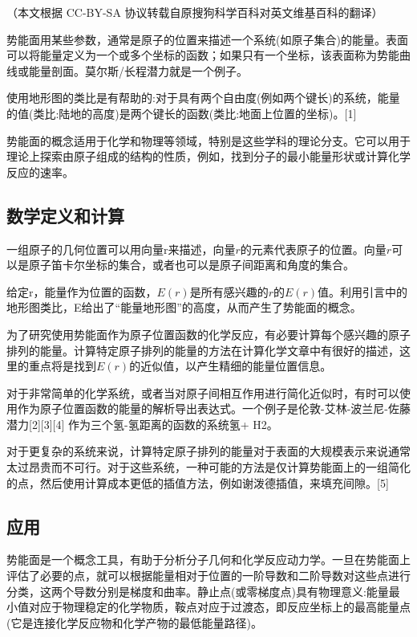 
（本文根据 CC-BY-SA 协议转载自原搜狗科学百科对英文维基百科的翻译）

势能面用某些参数，通常是原子的位置来描述一个系统(如原子集合)的能量。表面可以将能量定义为一个或多个坐标的函数；如果只有一个坐标，该表面称为势能曲线或能量剖面。莫尔斯/长程潜力就是一个例子。

使用地形图的类比是有帮助的:对于具有两个自由度(例如两个键长)的系统，能量的值(类比:陆地的高度)是两个键长的函数(类比:地面上位置的坐标)。[1]

势能面的概念适用于化学和物理等领域，特别是这些学科的理论分支。它可以用于理论上探索由原子组成的结构的性质，例如，找到分子的最小能量形状或计算化学反应的速率。

\subsection{数学定义和计算}
一组原子的几何位置可以用向量r来描述，向量$r$的元素代表原子的位置。向量$r$可以是原子笛卡尔坐标的集合，或者也可以是原子间距离和角度的集合。

给定r，能量作为位置的函数，$E(r)$是所有感兴趣的$r$的$E(r)$值。利用引言中的地形图类比，E给出了“能量地形图”的高度，从而产生了势能面的概念。

为了研究使用势能面作为原子位置函数的化学反应，有必要计算每个感兴趣的原子排列的能量。计算特定原子排列的能量的方法在计算化学文章中有很好的描述，这里的重点将是找到$E(r)$的近似值，以产生精细的能量位置信息。

对于非常简单的化学系统，或者当对原子间相互作用进行简化近似时，有时可以使用作为原子位置函数的能量的解析导出表达式。一个例子是伦敦-艾林-波兰尼-佐藤潜力[2][3][4] 作为三个氢-氢距离的函数的系统氢+ H2。

对于更复杂的系统来说，计算特定原子排列的能量对于表面的大规模表示来说通常太过昂贵而不可行。对于这些系统，一种可能的方法是仅计算势能面上的一组简化的点，然后使用计算成本更低的插值方法，例如谢泼德插值，来填充间隙。[5]

\subsection{应用}
势能面是一个概念工具，有助于分析分子几何和化学反应动力学。一旦在势能面上评估了必要的点，就可以根据能量相对于位置的一阶导数和二阶导数对这些点进行分类，这两个导数分别是梯度和曲率。静止点(或零梯度点)具有物理意义:能量最小值对应于物理稳定的化学物质，鞍点对应于过渡态，即反应坐标上的最高能量点(它是连接化学反应物和化学产物的最低能量路径)。

